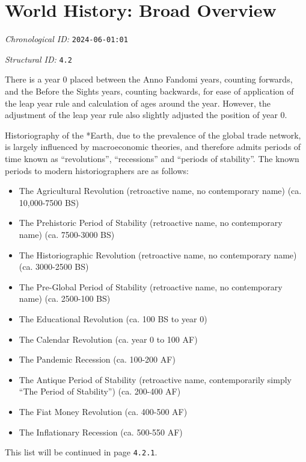 \section{World History: Broad Overview}
\emph{Chronological ID:} \texttt{2024-06-01:01}

\emph{Structural ID:} \texttt{4.2}

There is a year 0 placed between the Anno Fandomi years, counting forwards, and the Before the Sights years, counting backwards, for ease of application of the leap year rule and calculation of ages around the year. However, the adjustment of the leap year rule also slightly adjusted the position of year 0.

Historiography of the *Earth, due to the prevalence of the global trade network, is largely influenced by macroeconomic theories, and therefore admits periods of time known as ``revolutions'', ``recessions'' and ``periods of stability''. The known periods to modern historiographers are as follows:

\begin{itemize}
  \item The Agricultural Revolution (retroactive name, no contemporary name) (ca. 10,000-7500 BS)
  \item The Prehistoric Period of Stability (retroactive name, no contemporary name) (ca. 7500-3000 BS)
  \item The Historiographic Revolution (retroactive name, no contemporary name) (ca. 3000-2500 BS)
  \item The Pre-Global Period of Stability (retroactive name, no contemporary name) (ca. 2500-100 BS)
  \item The Educational Revolution (ca. 100 BS to year 0)
  \item The Calendar Revolution (ca. year 0 to 100 AF)
  \item The Pandemic Recession (ca. 100-200 AF)
  \item The Antique Period of Stability (retroactive name, contemporarily simply ``The Period of Stability'') (ca. 200-400 AF)
  \item The Fiat Money Revolution (ca. 400-500 AF)
  \item The Inflationary Recession (ca. 500-550 AF)
\end{itemize}

This list will be continued in page \texttt{4.2.1}.
\newpage

